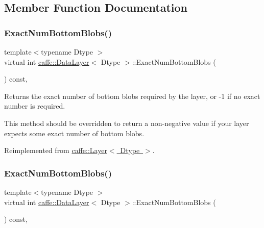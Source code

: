 \subsection{Member Function Documentation}
\mbox{\label{classcaffe_1_1_data_layer_a2b6fa99ededf0863d8bab4a7a46addae}} 
\subsubsection{\texorpdfstring{Exact\+Num\+Bottom\+Blobs()}{ExactNumBottomBlobs()}\hspace{0.1cm}{\footnotesize\ttfamily [1/2]}}
{\footnotesize\ttfamily template$<$typename Dtype $>$ \\
virtual int \mbox{\hyperlink{classcaffe_1_1_data_layer}{caffe\+::\+Data\+Layer}}$<$ Dtype $>$\+::Exact\+Num\+Bottom\+Blobs (\begin{DoxyParamCaption}{ }\end{DoxyParamCaption}) const\hspace{0.3cm}{\ttfamily [inline]}, {\ttfamily [virtual]}}



Returns the exact number of bottom blobs required by the layer, or -\/1 if no exact number is required. 

This method should be overridden to return a non-\/negative value if your layer expects some exact number of bottom blobs. 

Reimplemented from \mbox{\hyperlink{classcaffe_1_1_layer_a8e5ee0494d85f5f55fc4396537cbc60f}{caffe\+::\+Layer$<$ Dtype $>$}}.

\mbox{\label{classcaffe_1_1_data_layer_a2b6fa99ededf0863d8bab4a7a46addae}} 
\subsubsection{\texorpdfstring{Exact\+Num\+Bottom\+Blobs()}{ExactNumBottomBlobs()}\hspace{0.1cm}{\footnotesize\ttfamily [2/2]}}
{\footnotesize\ttfamily template$<$typename Dtype $>$ \\
virtual int \mbox{\hyperlink{classcaffe_1_1_data_layer}{caffe\+::\+Data\+Layer}}$<$ Dtype $>$\+::Exact\+Num\+Bottom\+Blobs (\begin{DoxyParamCaption}{ }\end{DoxyParamCaption}) const\hspace{0.3cm}{\ttfamily [inline]}, {\ttfamily [virtual]}}



